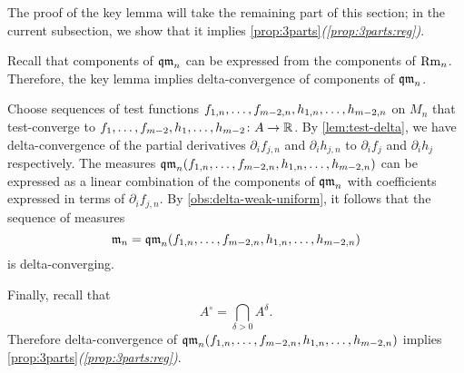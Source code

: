 The proof of the key lemma will take the remaining part of this section;
in the current subsection, we show that it implies \ref{prop:3parts}\textit{(\ref{prop:3parts:reg})}.

Recall that components of $\operatorname{\mathfrak{qm}}_n$ can be expressed from the components of $\operatorname{\rm Rm}_n$.
Therefore, the key lemma implies delta-convergence of components of $\operatorname{\mathfrak{qm}}_n$.

Choose sequences of test functions $f_{1,n},\zz\dots,f_{m-2,n},h_{1,n},\zz\dots,h_{m-2,n}$ on $M_n$ that test-converge to $f_{1},\zz\dots,f_{m-2},h_{1},\zz\dots,h_{m-2}\:A\to \RR$.
By \ref{lem:test-delta}, we have delta-convergence of the partial derivatives $\partial_if_{j,n}$ and 
$\partial_ih_{j,n}$ to $\partial_if_{j}$ and 
$\partial_ih_{j}$ respectively.
The measures $\qm_n(f_{1,n},\zz\dots,f_{m-2,n},\zz{}h_{1,n},\zz\dots,h_{m-2,n})$ 
can be expressed as a linear combination of the components of $\operatorname{\mathfrak{qm}}_n$ with coefficients expressed in terms of $\partial_if_{j,n}$.
By \ref{obs:delta-weak-uniform}, it follows that the sequence of measures 
\[\mathfrak m_n=\qm_n(f_{1,n},\dots,f_{m-2,n},h_{1,n},\zz\dots,h_{m-2,n})\]
is delta-converging.

Finally, recall that 
\[A^\circ=\bigcap_{\delta>0}A^\delta.\]
Therefore delta-convergence of $\qm_n(f_{1,n},\dots,f_{m-2,n},h_{1,n},\zz\dots,h_{m-2,n})$ implies \ref{prop:3parts}\textit{(\ref{prop:3parts:reg})}.
\qeds
